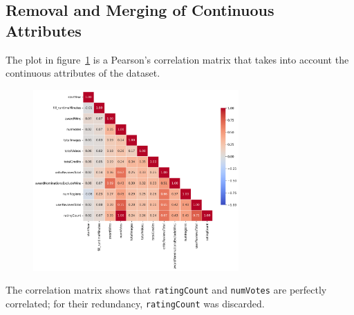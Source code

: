 \vspace{2em}
\subsection{Removal and Merging of Continuous Attributes}\label{sec:var_elim_creation}



 The plot in figure~\ref{fig:correlation_matrix} is a Pearson's correlation matrix that takes into
account the continuous attributes of the dataset.\\

\begin{figure}[H]
    \centering
    \includegraphics[width=0.70\textwidth]{plots/correlation_matrix.png}
    \label{fig:correlation_matrix}
\end{figure}
The correlation matrix shows that \texttt{ratingCount} and \texttt{numVotes} are perfectly correlated;
for their redundancy, \texttt{ratingCount} was discarded.\\

